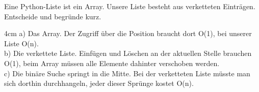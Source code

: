 \question[3]
Eine Python-Liste ist ein Array. Unsere Liste besteht aus verketteten Einträgen. Entscheide und begründe kurz.
\begin{solutionbox}{4cm}
a) Das Array. Der Zugriff über die Position braucht dort O(1), bei unserer Liste O(n). \\
b) Die verkettete Liste. Einfügen und Löschen an der aktuellen Stelle brauchen O(1), beim Array müssen alle
Elemente dahinter verschoben werden. \\
c) Die binäre Suche springt in die Mitte. Bei der verketteten Liste müsste man sich dorthin durchhangeln, jeder dieser Sprünge kostet O(n).
\end{solutionbox}
